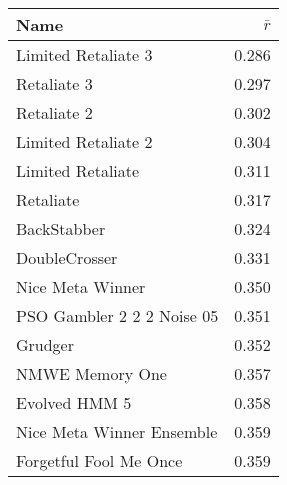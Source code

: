 \begin{tabular}{lr}
\toprule
Name                       &     \(\bar{r}\) \\
\midrule
Limited Retaliate 3        &            0.286 \\
Retaliate 3                &            0.297 \\
Retaliate 2                &            0.302 \\
Limited Retaliate 2        &            0.304 \\
Limited Retaliate          &            0.311 \\
Retaliate                  &            0.317 \\
BackStabber                &            0.324 \\
DoubleCrosser              &            0.331 \\
Nice Meta Winner           &            0.350 \\
PSO Gambler 2 2 2 Noise 05 &            0.351 \\
Grudger                    &            0.352 \\
NMWE Memory One            &            0.357 \\
Evolved HMM 5              &            0.358 \\
Nice Meta Winner Ensemble  &            0.359 \\
Forgetful Fool Me Once     &            0.359 \\
\bottomrule
\end{tabular}
